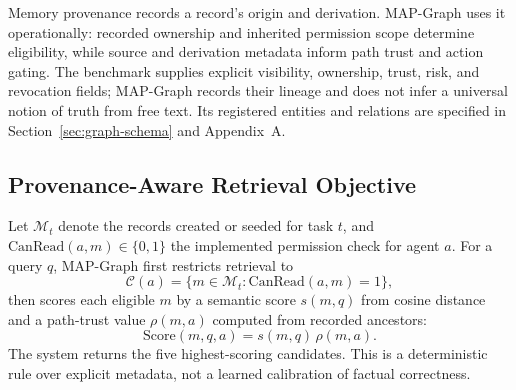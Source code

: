 \documentclass[letterpaper]{article} %
\begin{document}
Memory provenance records a record's origin and derivation. MAP-Graph uses it operationally: recorded ownership and inherited permission scope determine eligibility, while source and derivation metadata inform path trust and action gating. The benchmark supplies explicit visibility, ownership, trust, risk, and revocation fields; MAP-Graph records their lineage and does not infer a universal notion of truth from free text. Its registered entities and relations are specified in Section~\ref{sec:graph-schema} and Appendix~A.

\subsection{Provenance-Aware Retrieval Objective}
\label{sec:provenance-aware-retrieval-objective}

Let $\mathcal{M}_t$ denote the records created or seeded for task $t$, and $\mathrm{CanRead}(a,m)\in\{0,1\}$ the implemented permission check for agent $a$. For a query $q$, MAP-Graph first restricts retrieval to
\begin{equation}
\mathcal{C}(a)=\{m\in\mathcal{M}_t:\mathrm{CanRead}(a,m)=1\},
\label{eq:permission-candidates}
\end{equation}
then scores each eligible $m$ by a semantic score $s(m,q)$ from cosine distance and a path-trust value $\rho(m,a)$ computed from recorded ancestors:
\begin{equation}
\mathrm{Score}(m,q,a)=s(m,q)\,\rho(m,a).
\label{eq:implemented-retrieval-objective}
\end{equation}
The system returns the five highest-scoring candidates. This is a deterministic rule over explicit metadata, not a learned calibration of factual correctness.
\end{document}
